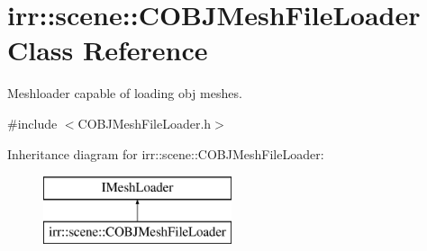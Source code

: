\hypertarget{classirr_1_1scene_1_1_c_o_b_j_mesh_file_loader}{\section{irr\-:\-:scene\-:\-:C\-O\-B\-J\-Mesh\-File\-Loader Class Reference}
\label{classirr_1_1scene_1_1_c_o_b_j_mesh_file_loader}
}


Meshloader capable of loading obj meshes.  




{\ttfamily \#include $<$C\-O\-B\-J\-Mesh\-File\-Loader.\-h$>$}

Inheritance diagram for irr\-:\-:scene\-:\-:C\-O\-B\-J\-Mesh\-File\-Loader\-:\begin{figure}[H]
\begin{center}
\leavevmode
\includegraphics[height=2.000000cm]{classirr_1_1scene_1_1_c_o_b_j_mesh_file_loader}
\end{center}
\end{figure}
